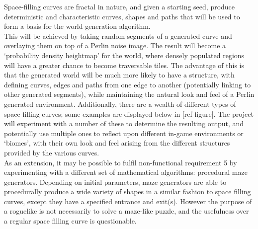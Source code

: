 \documentclass[12pt,a4paper]{article}
\begin{document}
Space-filling curves are fractal in nature, and given a starting seed, produce deterministic and characteristic curves, shapes and paths that will be used to form a basis for the world generation algorithm.\\

This will be achieved by taking random segments of a generated curve and overlaying them on top of a Perlin noise image. The result will become a `probability density heightmap' for the world, where densely populated regions will have a greater chance to become traversable tiles. The advantage of this is that the generated world will be much more likely to have a structure, with defining curves, edges and paths from one edge to another (potentially linking to other generated segments), while maintaining the natural look and feel of a Perlin generated environment. Additionally, there are a wealth of different types of space-filling curves; some examples are displayed below in [ref figure]. The project will experiment with a number of these to determine the resulting output, and potentially use multiple ones to reflect upon different in-game environments or `biomes', with their own look and feel arising from the different structures provided by the various curves. \\

As an extension, it may be possible to fulfil non-functional requirement 5 by experimenting with a different set of mathematical algorithms: procedural maze generators. Depending on initial parameters, maze generators are able to procedurally produce a wide variety of shapes in a similar fashion to space filling curves, except they have a specified entrance and exit(s). However the purpose of a roguelike is not necessarily to solve a maze-like puzzle, and the usefulness over a regular space filling curve is questionable.
\end{document}
